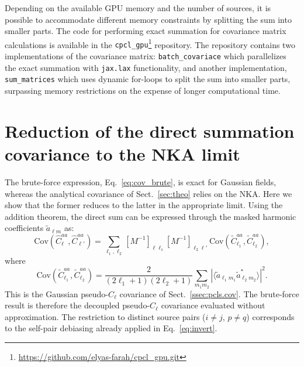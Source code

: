 \documentclass[%
 reprint,
superscriptaddress,
nofootinbib,
 amsmath,amssymb,
 aps,
 prd,
]{revtex4-2}
\begin{document}
Depending on the available GPU memory and the number of sources, it is possible to accommodate different memory constraints by splitting the sum into smaller parts. The code for performing exact summation for covariance matrix calculations is available in  the {\tt cpcl\_gpu}\footnote{\url{https://github.com/elyas-farah/cpcl_gpu.git}} repository. The repository contains two implementations of the covariance matrix: {\tt batch\_covariace} which parallelizes the exact summation with {\tt jax.lax} functionality, and another implementation, {\tt sum\_matrices} which uses dynamic for-loops to split the sum into smaller parts, surpassing memory restrictions on the expense of longer computational time.

\section{Reduction of the direct summation covariance to the NKA limit}\label{app:brute_nka}
The brute-force expression, Eq.~\ref{eq:cov_brute}, is exact for Gaussian fields, whereas the analytical covariance of Sect.~\ref{sec:theo} relies on the NKA. Here we show that the former reduces to the latter in the appropriate limit.
Using the addition theorem, the direct sum can be expressed through the masked harmonic coefficients $\tilde{a}_{\ell m}$ as:
\begin{equation}\label{eq:brute_as_cov}
    \mathrm{Cov}(\hat{C}_\ell^{aa},\hat{C}_{\ell'}^{aa}) = \sum_{\ell_1,\ell_2}[M^{-1}]_{\ell\ell_1}[M^{-1}]_{\ell_2\ell'}\,\mathrm{Cov}(\tilde{C}_{\ell_1}^{aa},\tilde{C}_{\ell_2}^{aa}),
\end{equation}
where
\begin{equation}\label{eq:pcl_cov_harm}
    \mathrm{Cov}(\tilde{C}_{\ell_1}^{aa},\tilde{C}_{\ell_2}^{aa}) = \frac{2}{(2\ell_1+1)(2\ell_2+1)}\sum_{m_1 m_2}\left|\langle \tilde{a}_{\ell_1 m_1}\tilde{a}^*_{\ell_2 m_2}\rangle\right|^2.
\end{equation}
This is the Gaussian pseudo-$C_\ell$ covariance of Sect.~\ref{ssec:pcls.cov}. The brute-force result is therefore the decoupled pseudo-$C_\ell$ covariance evaluated without approximation. The restriction to distinct source pairs ($i\neq j$, $p\neq q$) corresponds to the self-pair debiasing already applied in Eq.~\ref{eq:invert}.
 
\end{document}
